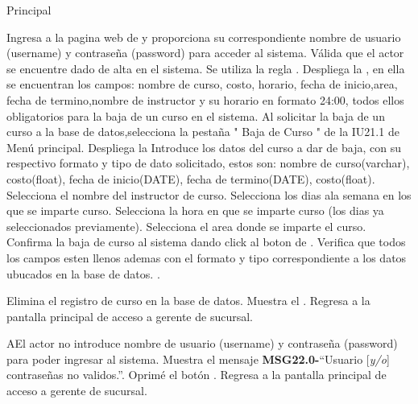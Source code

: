 	\begin{UCtrayectoria}{Principal}
	
	\UCpaso[\UCactor] Ingresa a la pagina web de \label{CU22.0Login} y proporciona su correspondiente nombre de usuario (username) y contraseña (password) para acceder al sistema.
		\UCpaso Válida que el actor se encuentre dado de alta en el sistema. Se utiliza la regla  .
		\UCpaso Despliega la , en ella se encuentran los campos: nombre de curso, costo, horario, fecha de inicio,area, fecha de termino,nombre de instructor y su  horario en formato 24:00, todos ellos obligatorios para la baja de un curso en el sistema.	
	\UCpaso[\UCactor] Al solicitar la baja de un curso a la base de datos,selecciona la pestaña " Baja de Curso  " de la IU21.1 de Menú principal.
	\UCpaso Despliega la 
	\UCpaso[\UCactor] Introduce los datos del curso a dar de baja, con su respectivo formato y tipo de dato solicitado, estos son: nombre de curso(varchar), costo(float), fecha de inicio(DATE), fecha de termino(DATE), costo(float).
    \UCpaso[\UCactor] Selecciona el nombre del instructor de curso.
	\UCpaso[\UCactor] Selecciona los dias ala semana en los que se imparte curso.
	\UCpaso[\UCactor] Selecciona la hora en que se imparte curso (los dias ya seleccionados previamente).
	\UCpaso[\UCactor] Selecciona el area donde se imparte el curso.
	\UCpaso[\UCactor] Confirma la baja de curso al sistema dando click al boton  de \label{IU22.1 Baja Curso}.
	\UCpaso Verifica que todos los campos esten llenos ademas con el formato y tipo correspondiente a los datos ubucados en la base de datos.  .
		
		\UCpaso Elimina el registro de curso en la base de datos.
		\UCpaso Muestra el .
		\UCpaso Regresa a la pantalla principal de acceso a gerente de sucursal.
\end{UCtrayectoria}

\begin{UCtrayectoriaA}{A}{El actor no introduce nombre de usuario (username) y contraseña (password) para poder ingresar al sistema.}
			\UCpaso Muestra el mensaje {\bf MSG22.0-}``Usuario [{\em y/o}] contraseñas no validos.''.
			\UCpaso[\UCactor] Oprimé el botón .
			\UCpaso Regresa a la pantalla principal de acceso a gerente de sucursal.
		\end{UCtrayectoriaA}

